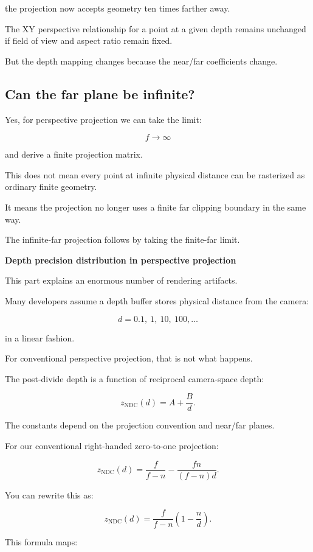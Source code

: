 the projection now accepts geometry ten times farther away.

The XY perspective relationship for a point at a given depth remains unchanged if field of view and aspect ratio remain fixed.

But the depth mapping changes because the near/far coefficients change.

\subsection{Can the far plane be infinite?}\label{02-foundations-ii-ch033-can-the-far-plane-be-infinite}

Yes, for perspective projection we can take the limit:

\[
 f\to\infty
\]

and derive a finite projection matrix.

This does not mean every point at infinite physical distance can be rasterized as ordinary finite geometry.

It means the projection no longer uses a finite far clipping boundary in the same way.

The infinite-far projection follows by taking the finite-far limit.

\textbf{Depth precision distribution in perspective projection}

This part explains an enormous number of rendering artifacts.

Many developers assume a depth buffer stores physical distance from the camera:

\[
 d=0.1,\ 1,\ 10,\ 100,\ldots
\]

in a linear fashion.

For conventional perspective projection, that is not what happens.

The post-divide depth is a function of reciprocal camera-space depth:

\[
 \boxed{ z_{\mathrm{NDC}}(d)=A+\frac Bd }.
\]

The constants depend on the projection convention and near/far planes.

For our conventional right-handed zero-to-one projection:

\[
 \boxed{ z_{\mathrm{NDC}}(d) = \frac f{f-n} - \frac{fn}{(f-n)d} }.
\]

You can rewrite this as:

\[
 \boxed{ z_{\mathrm{NDC}}(d) = \frac f{f-n}\left(1-\frac nd\right) }.
\]

This formula maps:

